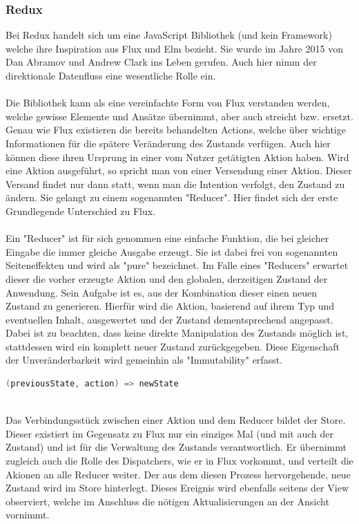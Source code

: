 \subsubsection{Redux}
\label{subsec:redux}
Bei Redux handelt sich um eine JavaScript Bibliothek (und kein Framework) welche ihre Inspiration aus Flux und Elm bezieht. Sie wurde im Jahre 2015 von Dan Abramov und Andrew Clark ins Leben gerufen.
\cite{reduxIntroduction}
Auch hier nimm der direktionale Datenfluss eine wesentliche Rolle ein.
\\
\\
Die Bibliothek kann als eine vereinfachte Form von Flux verstanden werden, welche gewisse Elemente und Ansätze übernimmt, aber auch streicht bzw. ersetzt. Genau wie Flux existieren die bereits behandelten Actions, welche über wichtige Informationen für die spätere Veränderung des Zustands verfügen. Auch hier können diese ihren Ursprung in einer vom Nutzer getätigten Aktion haben. Wird eine Aktion ausgeführt, so spricht man von einer Versendung einer Aktion. Dieser Versand findet nur dann statt, wenn man die Intention verfolgt, den Zustand zu ändern. Sie gelangt zu einem sogenannten "Reducer". Hier findet sich der erste Grundlegende Unterschied zu Flux.
\\
\\
Ein "Reducer" ist für sich genommen eine einfache Funktion, die bei gleicher Eingabe die immer gleiche Ausgabe erzeugt. Sie ist dabei frei von sogenannten Seiteneffekten und wird als "pure" bezeichnet. Im Falle eines "Reducers" erwartet dieser die vorher erzeugte Aktion und den globalen, derzeitigen Zustand der Anwendung. Sein Aufgabe ist es, aus der Kombination dieser einen neuen Zustand zu generieren. Hierfür wird die Aktion, basierend auf ihrem Typ und eventuellen Inhalt, ausgewertet und der Zustand dementsprechend angepasst. Dabei ist zu beachten, dass keine direkte Manipulation des Zustands möglich ist, stattdessen wird ein komplett neuer Zustand zurückgegeben. Diese Eigenschaft der Unveränderbarkeit wird gemeinhin als "Immutability" erfasst.
\\
\begin{lstlisting}[frame=single, language=Java]
(previousState, action) => newState
\end{lstlisting}
\ \\
Das Verbindungsstück zwischen einer Aktion und dem Reducer bildet der Store. Dieser existiert im Gegensatz zu Flux nur ein einziges Mal (und mit auch der Zustand) und ist für die Verwaltung des Zustands verantwortlich. Er übernimmt zugleich auch die Rolle des Dispatchers, wie er in Flux vorkommt, und verteilt die Akionen an alle Reducer weiter. Der aus dem diesen Prozess hervorgehende, neue Zustand wird im Store hinterlegt. Dieses Ereignis wird ebenfalls seitens der View observiert, welche im Anschluss die nötigen Aktualisierungen an der Ansicht vornimmt.
